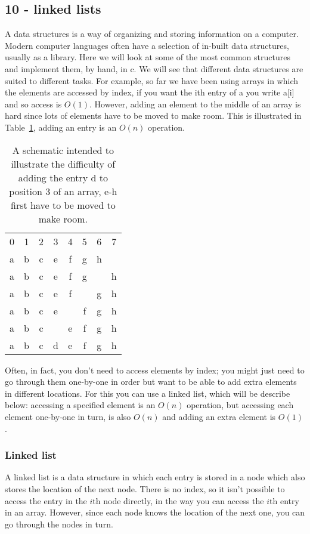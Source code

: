 \documentclass[11pt,a4paper]{scrartcl}
\begin{document}
\subsection*{10 - linked lists}

A data structures is a way of organizing and storing information on a
computer. Modern computer languages often have a selection of in-built
data structures, usually as a library. Here we will look at some of
the most common structures and implement them, by hand, in c. We will
see that different data structures are suited to different tasks. For
example, so far we have been using arrays in which the elements are
accessed by index, if you want the ith entry of a you write a[i] and
so access is $O(1)$. However, adding an element to the middle of an
array is hard since lots of elements have to be moved to make
room. This is illustrated in Table~\ref{table_reindexing}, adding an
entry is an $O(n)$ operation.

\begin{table}[b]
\begin{tabular}{cccc cccc}
0&1&2&3&4&5&6&7\\
a&b&c&e&f&g&h&\\
a&b&c&e&f&g&&h\\
a&b&c&e&f&&g&h\\
a&b&c&e&&f&g&h\\
a&b&c&&e&f&g&h\\
a&b&c&d&e&f&g&h
\end{tabular}
\caption{A schematic intended to illustrate the difficulty of adding the entry d to position 3 of an array, e-h first have to be moved to make room.\label{table_reindexing}}
\end{table}

Often, in fact, you don't need to access elements by index; you might
just need to go through them one-by-one in order but want to be able
to add extra elements in different locations. For this you can use a
linked list, which will be describe below: accessing a specified
element is an $O(n)$ operation, but accessing each element one-by-one
in turn, is also $O(n)$ and adding an extra element is $O(1)$.

\subsubsection*{Linked list}

A linked list is a data structure in which each entry is stored in a
node which also stores the location of the next node. There is no
index, so it isn't possible to access the entry in the $i$th node
directly, in the way you can access the $i$th entry in an
array. However, since each node knows the location of the next one,
you can go through the nodes in turn.
\end{document}
